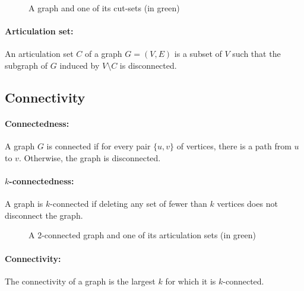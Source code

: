 \begin{figure}[!h]
  \caption{A graph and one of its cut-sets (in green)}
  \begin{center}
    
  \end{center}
\end{figure}


\paragraph{Articulation set:}
An articulation set $C$ of a graph $G=(V,E)$ is a subset of $V$ such that the
subgraph of $G$ induced by $V \setminus C$ is disconnected.

\subsection{Connectivity}
\paragraph{Connectedness:}\label{defConnectivity}
A graph $G$ is connected if for every pair $\{u,v\}$ of vertices, there is a 
path from $u$ to $v$. Otherwise, the graph is disconnected.

\paragraph{$k$-connectedness:}
A graph is $k$-connected if deleting any set of fewer than $k$ vertices does not
disconnect the graph.

\begin{figure}[!h]
  \caption{A 2-connected graph and one of its articulation sets (in green)}
  \begin{center}
    
  \end{center}
\end{figure}

\paragraph{Connectivity:}
The connectivity of a graph is the largest $k$ for which it is $k$-connected. 

